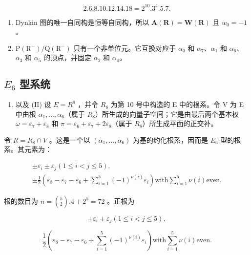 \[
2. 6. 8. 10. 12. 14. 18 = 2 ^ {10}. 3 ^ {4}. 5. 7.
\]

\begin{enumerate}
\def\labelenumi{(\Roman{enumi})}
\setcounter{enumi}{10}
\item
  Dynkin 图的唯一自同构是恒等自同构，所以 \(\mathbf{A}(\mathbf{R}) = \mathbf{W}(\mathbf{R})\) 且 \(w_0 = -1\)。
\item
  \(\mathrm{P}(\mathrm{R}^{-})/\mathrm{Q}(\mathrm{R}^{-})\) 只有一个非单位元。它互换对应于 \(\alpha_{0}\) 和 \(\alpha_{7}\)、\(\alpha_{1}\) 和 \(\alpha_{6}\)、\(\alpha_{3}\) 和 \(\alpha_{5}\) 的顶点，并固定 \(\alpha_{2}\) 和 \(\alpha_{4}\)。
\end{enumerate}

\subsection{\texorpdfstring{\(E_{6}\) 型系统}{E\_6 型系统}}

\begin{enumerate}
\def\labelenumi{(\Roman{enumi})}
\tightlist
\item
  以及 (II) 设 \(E = R^{8}\) ，并令 \(R_{8}\) 为第 10 号中构造的 E 中的根系。令 V 为 E 中由根 \(\alpha_{1}, \ldots, \alpha_{6}\)（属于 \(R_{8}\)）所生成的向量子空间；它是由最后两个基本权 \(\omega = \varepsilon_{7} + \varepsilon_{8}\) 和 \(\pi = \varepsilon_{6} + \varepsilon_{7} + 2\varepsilon_{8}\)（属于 \(R_{8}\)）所生成平面的正交补。
\end{enumerate}

令 \(R = R_{8} \cap V\) 。这是一个以 \((\alpha_{1}, \ldots, \alpha_{6})\) 为基的约化根系，因而是 \(E_{6}\) 型的根系。其元素为：

\[
\begin{array}{c} \pm \varepsilon_ {i} \pm \varepsilon_ {j} (1 \leqslant i <   j \leqslant 5), \\ \pm \frac {1}{2} (\varepsilon_ {8} - \varepsilon_ {7} - \varepsilon_ {6} + \sum_ {i = 1} ^ {5} (- 1) ^ {\nu (i)} \varepsilon_ {i}) \text {with} \sum_ {i = 1} ^ {5} \nu (i) \text {even.} \end{array}
\]

根的数目为 \(n = \binom{5}{2}.4 + 2^5 = 72\) 。正根为

\[
\pm \varepsilon_ {i} + \varepsilon_ {j} (1 \leqslant i <   j \leqslant 5),
\]

\[
\frac {1}{2} \left(\varepsilon_ {8} - \varepsilon_ {7} - \varepsilon_ {6} + \sum_ {i = 1} ^ {5} (- 1) ^ {\nu (i)} \varepsilon_ {i}\right) \text {with} \sum_ {i = 1} ^ {5} \nu (i) \text {even}.
\]

